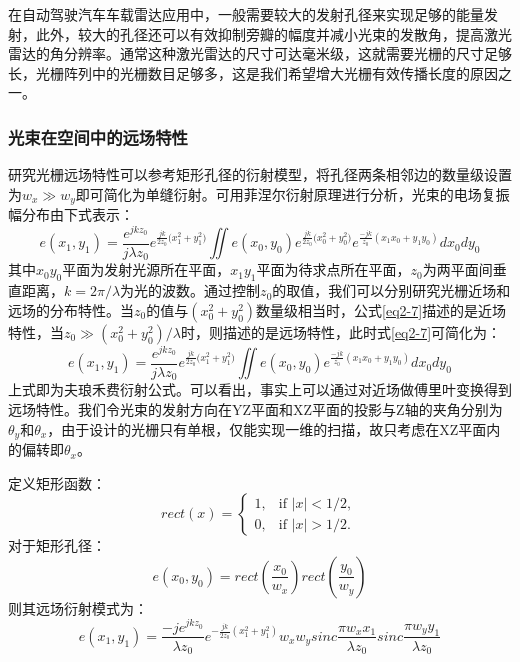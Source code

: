 \documentclass[UTF8,a4paper,12pt]{ctexart}
\numberwithin{equation}{section}
\begin{document}
在自动驾驶汽车车载雷达应用中，一般需要较大的发射孔径来实现足够的能量发射，此外，较大的孔径还可以有效抑制旁瓣的幅度并减小光束的发散角，提高激光雷达的角分辨率。通常这种激光雷达的尺寸可达毫米级，这就需要光栅的尺寸足够长，光栅阵列中的光栅数目足够多，这是我们希望增大光栅有效传播长度的原因之一。


\subsubsection{光束在空间中的远场特性}
\label{sec2-4-2}
研究光栅远场特性可以参考矩形孔径的衍射模型，将孔径两条相邻边的数量级设置为$w_x\gg w_y$即可简化为单缝衍射。可用菲涅尔衍射原理进行分析，光束的电场复振幅分布由下式表示：
\begin{equation}
    e(x_1,y_1) = \frac{e^{jkz_0}}{j\lambda z_0}e^{\frac{jk}{2z_0}({x^2_1+y^2_1)}}\iint e(x_0,y_0)e^{\frac{jk}{2z_0}({x^2_0+y^2_0)}}e^{\frac{-jk}{z_0}(x_1x_0+y_1y_0)}dx_0dy_0
    \label{eq2-7}
\end{equation}
其中$x_0y_0$平面为发射光源所在平面，$x_1y_1$平面为待求点所在平面，$z_0$为两平面间垂直距离，$k={2\pi}/{\lambda}$为光的波数。通过控制$z_0$的取值，我们可以分别研究光栅近场和远场的分布特性。当$z_0$的值与$(x^2_0+y^2_0)$数量级相当时，公式\ref{eq2-7}描述的是近场特性，当$z_0\gg {(x^2_0+y^2_0)}/\lambda$时，则描述的是远场特性，此时式\ref{eq2-7}可简化为：
\begin{equation}
    e(x_1,y_1) = \frac{e^{jkz_0}}{j\lambda z_0}e^{\frac{jk}{2z_0}({x^2_1+y^2_1)}}\iint e(x_0,y_0)e^{\frac{-jk}{z_0}(x_1x_0+y_1y_0)}dx_0dy_0
    \label{eq2-8}
\end{equation}
上式即为夫琅禾费衍射公式。可以看出，事实上可以通过对近场做傅里叶变换得到远场特性。我们令光束的发射方向在YZ平面和XZ平面的投影与Z轴的夹角分别为$\theta_y$和$\theta_x$，由于设计的光栅只有单根，仅能实现一维的扫描，故只考虑在XZ平面内的偏转即$\theta_x$。

定义矩形函数：
    \[ rect(x) = \left\{
\begin{array}{rl}
1, & \text{if } |x| < 1/2,\\
0, & \text{if } |x| > 1/2.
\end{array} \right. \]
对于矩形孔径：
\begin{equation}
    e(x_0,y_0) = rect(\frac{x_0}{w_x})rect(\frac{y_0}{w_y})
    \label{eq2-9}
\end{equation}
则其远场衍射模式为：
\begin{equation}
    e(x_1,y_1)=\frac{-je^{jkz_0}}{\lambda z_0}e^{-\frac{jk}{2z_0}(x^2_1+y^2_1)}w_xw_y sinc{\frac{\pi w_xx_1}{\lambda z_0}}sinc{\frac{\pi w_yy_1}{\lambda z_0}}
    \label{eq2-9}
\end{equation}
\end{document}
